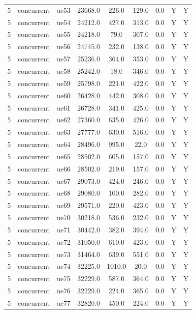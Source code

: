 \begin{table}[ht]
\begin{tabular}{|c|c|c|c|c|c|c|c|c|}
5 & concurrent & ue53 & 23668.0 & 226.0 & 129.0 & 0.0 & Y & Y \\
5 & concurrent & ue54 & 24212.0 & 427.0 & 313.0 & 0.0 & Y & Y \\
5 & concurrent & ue55 & 24218.0 & 79.0 & 307.0 & 0.0 & Y & Y \\
5 & concurrent & ue56 & 24745.0 & 232.0 & 138.0 & 0.0 & Y & Y \\
5 & concurrent & ue57 & 25236.0 & 364.0 & 353.0 & 0.0 & Y & Y \\
5 & concurrent & ue58 & 25242.0 & 18.0 & 346.0 & 0.0 & Y & Y \\
5 & concurrent & ue59 & 25798.0 & 221.0 & 422.0 & 0.0 & Y & Y \\
5 & concurrent & ue60 & 26428.0 & 442.0 & 308.0 & 0.0 & Y & Y \\
5 & concurrent & ue61 & 26728.0 & 341.0 & 425.0 & 0.0 & Y & Y \\
5 & concurrent & ue62 & 27360.0 & 635.0 & 426.0 & 0.0 & Y & Y \\
5 & concurrent & ue63 & 27777.0 & 630.0 & 516.0 & 0.0 & Y & Y \\
5 & concurrent & ue64 & 28496.0 & 995.0 & 22.0 & 0.0 & Y & Y \\
5 & concurrent & ue65 & 28502.0 & 605.0 & 157.0 & 0.0 & Y & Y \\
5 & concurrent & ue66 & 28502.0 & 219.0 & 157.0 & 0.0 & Y & Y \\
5 & concurrent & ue67 & 29073.0 & 424.0 & 246.0 & 0.0 & Y & Y \\
5 & concurrent & ue68 & 29080.0 & 100.0 & 282.0 & 0.0 & Y & Y \\
5 & concurrent & ue69 & 29571.0 & 220.0 & 423.0 & 0.0 & Y & Y \\
5 & concurrent & ue70 & 30218.0 & 536.0 & 232.0 & 0.0 & Y & Y \\
5 & concurrent & ue71 & 30442.0 & 382.0 & 394.0 & 0.0 & Y & Y \\
5 & concurrent & ue72 & 31050.0 & 610.0 & 423.0 & 0.0 & Y & Y \\
5 & concurrent & ue73 & 31464.0 & 639.0 & 551.0 & 0.0 & Y & Y \\
5 & concurrent & ue74 & 32225.0 & 1010.0 & 20.0 & 0.0 & Y & Y \\
5 & concurrent & ue75 & 32229.0 & 587.0 & 364.0 & 0.0 & Y & Y \\
5 & concurrent & ue76 & 32229.0 & 224.0 & 365.0 & 0.0 & Y & Y \\
5 & concurrent & ue77 & 32820.0 & 450.0 & 224.0 & 0.0 & Y & Y \\

\end{tabular}
\end{table}
